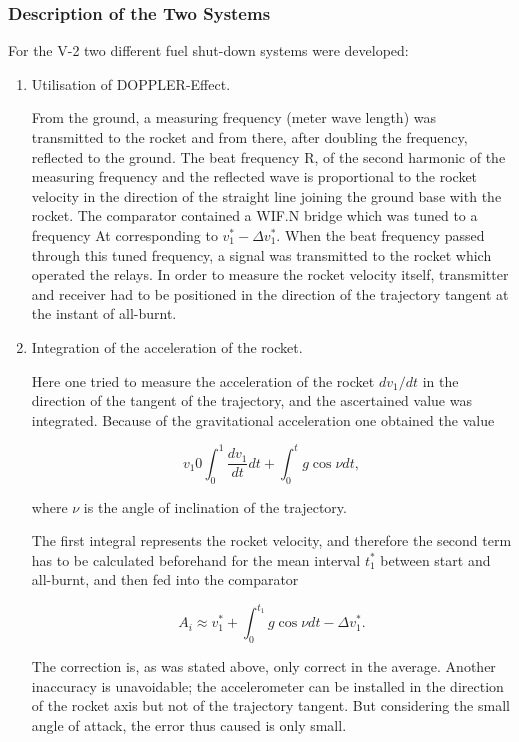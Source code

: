 \documentclass[12pt, a4paper]{article}
\begin{document}
\subsubsection{Description of the Two Systems}

For the V-2 two different fuel shut-down systems were developed:

\begin{enumerate}
  \item Utilisation of DOPPLER-Effect.

  From the ground, a measuring frequency (meter wave length) was transmitted to the rocket and from there, after doubling the frequency, reflected to the ground. The beat frequency R, of the second harmonic of the measuring frequency and the reflected wave is proportional to the rocket velocity in the direction of the straight line joining the ground base with the rocket. The comparator contained a WIF.N bridge which was tuned to a frequency At corresponding to $v_{1}^{*}-\Delta v_{1}^{*}$. When the beat frequency passed through this tuned frequency, a signal was transmitted to the rocket which operated the relays. In order to measure the rocket velocity itself, transmitter and receiver had to be positioned in the direction of the trajectory tangent at the instant of all-burnt.

  \item Integration of the acceleration of the rocket.

Here one tried to measure the acceleration of the rocket $dv_{1}/dt$ in the direction of the tangent of the trajectory, and the ascertained value was integrated. Because of the gravitational acceleration one obtained the value

\begin{equation}
  v_{1}0\int_{0}^{1}\frac{dv_{1}}{dt}dt+\int_{0}^{t}g\cos\nu dt,
\end{equation}

where $\nu$ is the angle of inclination of the trajectory.

The first integral represents the rocket velocity, and therefore the second term has to be calculated beforehand for the mean interval $t_{1}^{*}$ between start and all-burnt, and then fed into the comparator

\begin{equation}
  A_{i}\approx v_{1}^{*}+\int_{0}^{t_{1}}g\cos\nu dt-\Delta v_{1}^{*}.
\end{equation}

The correction is, as was stated above, only correct in the average. Another inaccuracy is unavoidable; the accelerometer can be installed in the direction of the rocket axis but not of the trajectory tangent. But considering the small angle of attack, the error thus caused is only small.


\end{enumerate}
\end{document}
